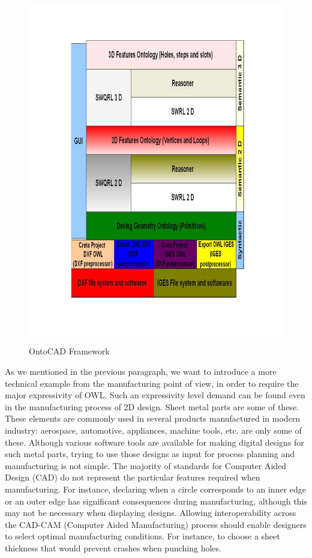\begin{figure}
\begin{center}
	\includegraphics[scale=0.8]{figure-chapterIV/fig4-33}\\
	\vspace{-40}
	\caption{OntoCAD Framework}
	\label{figure4-33}
\end{center}
\end{figure}

As we mentioned in the previous paragraph, we want to introduce a more technical example from the manufacturing point of view, in order to require the major expressivity of OWL. Such an expressivity level demand can be found even in the manufacturing process of 2D design. Sheet   metal parts are some of these. These elements are commonly used in several products manufactured in modern industry: aerospace, automotive, appliances, machine tools, etc. are only some of these. Although various software tools are available for making digital designs for such metal parts, trying to use those designs as input for process planning and manufacturing is not simple.  The majority of standards for Computer Aided Design (CAD) do not represent the particular features required when manufacturing. For instance, declaring when a circle corresponds to an inner edge or an outer edge has significant consequences during manufacturing, although this may not be necessary when displaying designs. Allowing interoperability across the CAD-CAM (Computer Aided Manufacturing) process should enable designers to select optimal manufacturing conditions. For instance, to choose a sheet thickness that would prevent crashes when punching holes.


